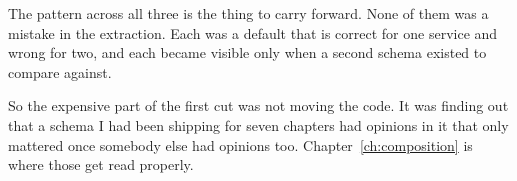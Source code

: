 The pattern across all three is the thing to carry forward. None of them was a
mistake in the extraction. Each was a default that is correct for one service
and wrong for two, and each became visible only when a second schema existed to
compare against.

So the expensive part of the first cut was not moving the code. It was finding
out that a schema I had been shipping for seven chapters had opinions in it that
only mattered once somebody else had opinions too.
Chapter~\ref{ch:composition} is where those get read properly.

%
